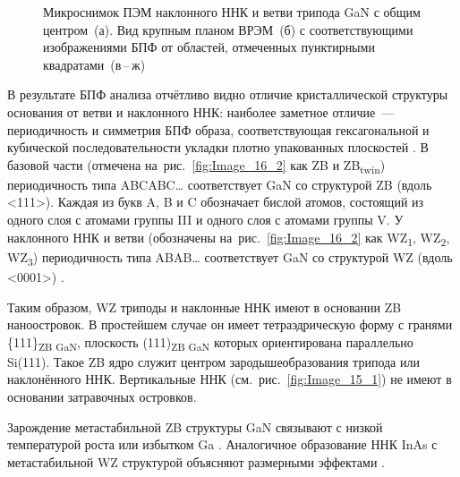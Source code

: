 \begin{figure}[ht] 
				\caption{Микроснимок ПЭМ наклонного ННК и ветви трипода GaN с общим
					центром~(а). Вид крупным планом ВРЭМ~(б) с соответствующими
			изображениями БПФ от областей, отмеченных пунктирными
	квадратами~(в\,--\,ж)}\label{fig:Image_16} \end{figure}

В результате БПФ анализа отчётливо видно отличие кристаллической структуры
основания от ветви и наклонного ННК: наиболее заметное отличие~---
периодичность и симметрия БПФ образа, соответствующая гексагональной и
кубической последовательности укладки плотно упакованных плоскостей
\cite{Jo2018, Bayram2014}. В базовой части (отмечена
на~рис.~\cref{fig:Image_16_2} как ZB и ZB\textsubscript{twin}) периодичность
типа ABCABC{\dots} соответствует GaN со структурой ZB (вдоль <111>). Каждая из
букв A, B и C обозначает бислой атомов, состоящий из одного слоя с атомами
группы III и одного слоя с атомами группы V. У наклонного ННК и ветви
(обозначены на~рис.~\cref{fig:Image_16_2} как WZ\textsubscript{1},
WZ\textsubscript{2}, WZ\textsubscript{3}) периодичность типа ABAB{\dots}
соответствует GaN со структурой WZ (вдоль <0001>) \cite{Kriegner2011}.

Таким образом, WZ триподы и наклонные ННК имеют в основании ZB наноостровок. В
простейшем случае он имеет тетраэдрическую форму с гранями
\{111\}\textsubscript{ZB GaN}, плоскость (111)\textsubscript{ZB GaN} которых
ориентирована параллельно Si(111). Такое ZB ядро служит центром
зародышеобразования трипода или наклонённого ННК. Вертикальные ННК
(см.~рис.~\cref{fig:Image_15_1}) не имеют в основании затравочных островков.

Зарождение метастабильной ZB структуры GaN связывают с низкой температурой
роста или избытком Ga \cite{Shi2006, Romano1997}. Аналогичное образование ННК
InAs с метастабильной WZ структурой объясняют размерными эффектами
\cite{Johansson2010}.

